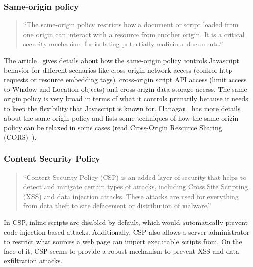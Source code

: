 \subsubsection{Same-origin policy}

\begin{quotation}
  ``The same-origin policy restricts how a document or script loaded from one origin
  can interact with a resource from another origin. It is a critical security mechanism
  for isolating potentially malicious documents.''~\cite{sameOrigin}
\end{quotation}
The article~\cite{sameOrigin} gives details about how the same-origin policy controls
Javascript behavior for different scenarios like cross-origin network access (control
http requests or resource embedding tags), cross-origin script API access (limit
access to Window and Location objects) and cross-origin data storage access. The
same origin policy is very broad in terms of what it controls primarily because it
needs to keep the flexibility that Javascript is known for. Flanagan~\cite[Section~13.6.2]{flanagan2011javascript}
has more details about the same origin policy and lists some techniques of how the
same origin policy can be relaxed in some cases (read Cross-Origin Resource Sharing
(CORS)~\cite{CORS}).

\subsubsection{Content Security Policy \label{sec:CSP}}

\begin{quotation}
``Content Security Policy (CSP) is an added layer of security that helps to detect
and mitigate certain types of attacks, including Cross Site Scripting (XSS) and
data injection attacks. These attacks are used for everything from data theft to
site defacement or distribution of malware.''~\cite{csp}
\end{quotation}
In CSP, inline scripts are disabled by default, which would automatically prevent
code injection based attacks. Additionally, CSP also allows a server administrator
to restrict what sources a web page can import executable scripts from. On the face
of it, CSP seems to provide a robust mechanism to prevent XSS and data exfiltration
attacks.

